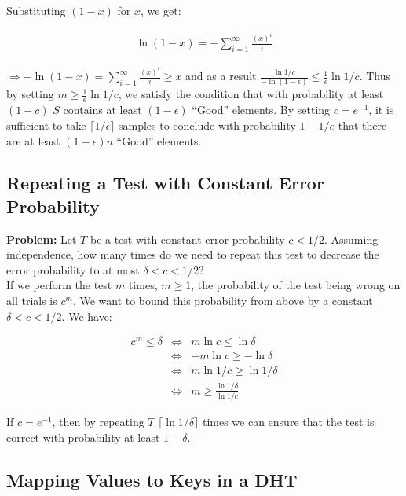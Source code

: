\documentclass{article}
\begin{document}
Substituting $(1-x)$ for $x$, we get:

\begin{eqnarray*}
\ln{(1-x)} = -\sum_{i=1}^{\infty} \frac{(x)^{i}}{i}
\end{eqnarray*}

$ \Rightarrow -\ln{(1-x)} = \sum_{i=1}^{\infty} \frac{(x)^{i}}{i} \geq x$
and as a result $\frac{\ln{1/c}}{-\ln{(1-\epsilon)}} \leq
\frac{1}{\epsilon} \ln{1/c}$. Thus by setting $m \geq 
\frac{1}{\epsilon} \ln{1/c}$, we satisfy the condition that with
probability at least $(1-c)$ $S$ contains at least $(1-\epsilon)$
``Good'' elements. By setting $c = e^{-1}$, it is sufficient to take
$\lceil 1/\epsilon \rceil$ samples to conclude with probability $1-1/e$ that
there are at least $(1-\epsilon)n$ ``Good'' elements.


\subsection{Repeating a Test with Constant Error Probability}
\label{sec:repeating} 

{\bf Problem:} Let $T$ be a test with constant error probability $c <
1/2$. Assuming independence, how many times do we need to repeat this
test to decrease the error probability to at most $\delta < c < 1/2$?\\

 If we perform the test $m$ times, $m \geq
1$, the probability of the test being wrong on all trials is $c^m$. We
want to bound this probability from above by a constant $\delta < c <
1/2$. We have:

\begin{eqnarray*}
c^m \leq \delta & \Leftrightarrow & m\ln{c} \leq \ln{\delta}\\
&\Leftrightarrow& -m\ln{c} \geq -\ln{\delta} \\
&\Leftrightarrow& m \ln{1/c} \geq \ln{1/\delta} \\
&\Leftrightarrow& m \geq \frac{\ln{1/\delta}}{\ln{1/c}}
\end{eqnarray*}

If $c = e^{-1}$, then by repeating $T$ $\lceil \ln{1/\delta} \rceil$
times we can ensure that the test is correct with probability at
least $1-\delta$.


\subsection{Mapping Values to Keys in a DHT}
\label{sec:mapping}
\end{document}
